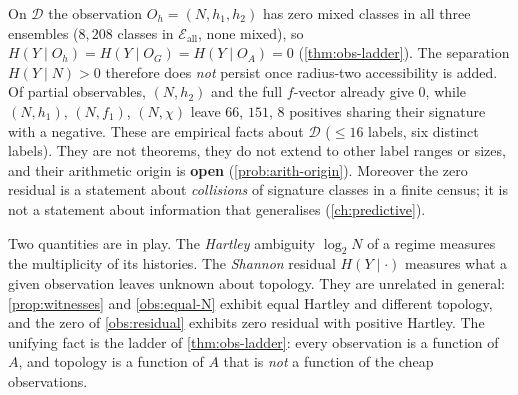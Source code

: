 \begin{observation}\label{obs:residual}
On $\mathcal D$ the observation $O_h=(N,h_1,h_2)$ has zero mixed classes in all three ensembles ($8{,}208$ classes in $\mathcal E_{\mathrm{all}}$, none mixed), so $H(Y\mid O_h)=H(Y\mid O_G)=H(Y\mid O_A)=0$ (\cref{thm:obs-ladder}). The separation $H(Y\mid N)>0$ therefore does \emph{not} persist once radius-two accessibility is added. Of partial observables, $(N,h_2)$ and the full $f$-vector already give $0$, while $(N,h_1)$, $(N,f_1)$, $(N,\chi)$ leave $66$, $151$, $8$ positives sharing their signature with a negative.
These are empirical facts about $\mathcal D$ ($\le16$ labels, six distinct labels). They are not theorems, they do not extend to other label ranges or sizes, and their arithmetic origin is \textbf{open} (\cref{prob:arith-origin}). Moreover the zero residual is a statement about \emph{collisions} of signature classes in a finite census; it is not a statement about information that generalises (\cref{ch:predictive}).
\end{observation}
\begin{remark}
Two quantities are in play. The \emph{Hartley} ambiguity $\log_2N$ of a regime measures the multiplicity of its histories. The \emph{Shannon} residual $H(Y\mid\cdot)$ measures what a given observation leaves unknown about topology. They are unrelated in general: \cref{prop:witnesses} and \cref{obs:equal-N} exhibit equal Hartley and different topology, and the zero of \cref{obs:residual} exhibits zero residual with positive Hartley. The unifying fact is the ladder of \cref{thm:obs-ladder}: every observation is a function of $A$, and topology is a function of $A$ that is \emph{not} a function of the cheap observations.
\end{remark}
